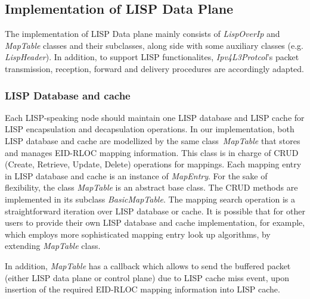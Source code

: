 \subsection{Implementation of LISP Data Plane}
\label{subsec:modifyInternet}
The implementation of LISP Data plane mainly consists of \emph{LispOverIp} and \emph{MapTable} classes and their subclasses, along side with some auxiliary classes (e.g. \emph{LispHeader}). In addition, to support LISP functionalites, \emph{Ipv4L3Protcol}'s packet transmission, reception, forward and delivery procedures are accordingly adapted.
\subsubsection{LISP Database and cache}
\label{subsec:database-impl}
Each LISP-speaking node should maintain one LISP database and LISP cache for LISP encapsulation and decapsulation operations. In our implementation, both LISP database and cache are modellized by the same class~\emph{MapTable} that stores and manages EID-RLOC mapping information. This class is in charge of CRUD (Create, Retrieve, Update, Delete) operations for mappings. Each mapping entry in LISP database and cache is an instance of \emph{MapEntry}. For the sake of flexibility, the class \emph{MapTable} is an abstract base class. The CRUD methods are implemented in its subclass \emph{BasicMapTable}. The mapping search operation is a straightforward iteration over LISP database or cache. It is possible that for other users to provide their own LISP database and cache implementation, for example, which employs more sophisticated mapping entry look up algorithms, by extending \emph{MapTable} class.

In addition, \emph{MapTable} has a callback which allows to send the buffered packet (either LISP data plane or control plane) due to LISP cache miss event, upon insertion of the required EID-RLOC mapping information into LISP cache.

